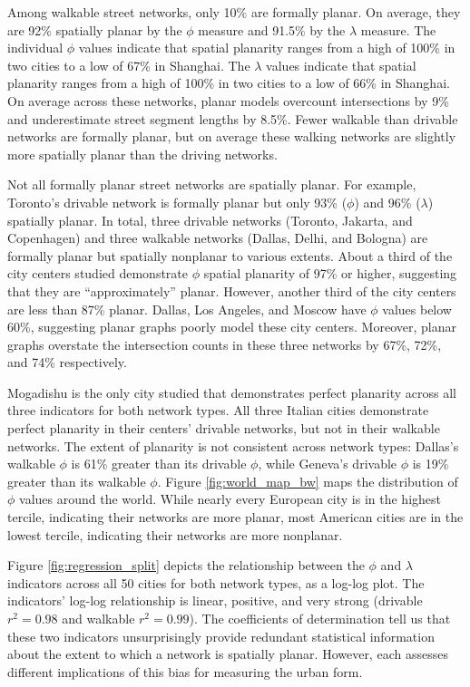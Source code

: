 \documentclass[Afour,sageh,times]{sagej}
\begin{document}
Among walkable street networks, only 10\% are formally planar. On average, they are 92\% spatially planar by the $\phi$ measure and 91.5\% by the $\lambda$ measure. The individual $\phi$ values indicate that spatial planarity ranges from a high of 100\% in two cities to a low of 67\% in Shanghai. The $\lambda$ values indicate that spatial planarity ranges from a high of 100\% in two cities to a low of 66\% in Shanghai. On average across these networks, planar models overcount intersections by 9\% and underestimate street segment lengths by 8.5\%. Fewer walkable than drivable networks are formally planar, but on average these walking networks are slightly more spatially planar than the driving networks.

Not all formally planar street networks are spatially planar. For example, Toronto's drivable network is formally planar but only 93\% ($\phi$) and 96\% ($\lambda$) spatially planar. In total, three drivable networks (Toronto, Jakarta, and Copenhagen) and three walkable networks (Dallas, Delhi, and Bologna) are formally planar but spatially nonplanar to various extents. About a third of the city centers studied demonstrate $\phi$ spatial planarity of 97\% or higher, suggesting that they are \enquote{approximately} planar. However, another third of the city centers are less than 87\% planar. Dallas, Los Angeles, and Moscow have $\phi$ values below 60\%, suggesting planar graphs poorly model these city centers. Moreover, planar graphs overstate the intersection counts in these three networks by 67\%, 72\%, and 74\% respectively.

Mogadishu is the only city studied that demonstrates perfect planarity across all three indicators for both network types. All three Italian cities demonstrate perfect planarity in their centers' drivable networks, but not in their walkable networks. The extent of planarity is not consistent across network types: Dallas's walkable $\phi$ is 61\% greater than its drivable $\phi$, while Geneva's drivable $\phi$ is 19\% greater than its walkable $\phi$. Figure \ref{fig:world_map_bw} maps the distribution of $\phi$ values around the world. While nearly every European city is in the highest tercile, indicating their networks are more planar, most American cities are in the lowest tercile, indicating their networks are more nonplanar.

Figure \ref{fig:regression_split} depicts the relationship between the $\phi$ and $\lambda$ indicators across all 50 cities for both network types, as a log-log plot. The indicators' log-log relationship is linear, positive, and very strong (drivable $r^2=0.98$ and walkable $r^2=0.99$). The coefficients of determination tell us that these two indicators unsurprisingly provide redundant statistical information about the extent to which a network is spatially planar. However, each assesses different implications of this bias for measuring the urban form.
\end{document}
